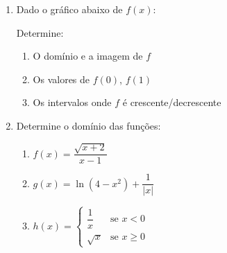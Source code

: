 \documentclass[12pt,a4paper]{article}
\begin{document}
\begin{enumerate}

\item Dado o gráfico abaixo de $f(x)$:
\begin{center}
\end{center}
Determine:
\begin{enumerate}
    \item O domínio e a imagem de $f$
    \item Os valores de $f(0)$, $f(1)$
    \item Os intervalos onde $f$ é crescente/decrescente
\end{enumerate}



\item Determine o domínio das funções:
\begin{enumerate}
    \item $f(x) = \dfrac{\sqrt{x+2}}{x-1}$
    \item $g(x) = \ln(4 - x^2) + \dfrac{1}{|x|}$
    \item $h(x) = \begin{cases} 
      \dfrac{1}{x} & \text{se } x < 0 \\ 
      \sqrt{x} & \text{se } x \geq 0 
    \end{cases}$
\end{enumerate}


\end{enumerate}
\end{document}
